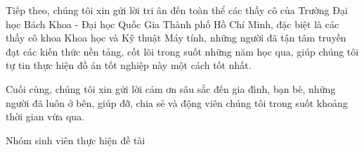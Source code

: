 Tiếp theo, chúng tôi xin gửi lời tri ân đến toàn thể các thầy cô của Trường Đại học Bách Khoa - Đại học Quốc Gia Thành phố Hồ Chí Minh, đặc biệt là các thầy cô khoa Khoa học và Kỹ thuật Máy tính, những người đã tận tâm truyền đạt các kiến thức nền tảng, cốt lõi trong suốt những năm học qua, giúp chúng tôi tự tin thực hiện đồ án tốt nghiệp này một cách tốt nhất.\vspace{0.5cm}

Cuối cùng, chúng tôi xin gửi lời cảm ơn sâu sắc đến gia đình, bạn bè, những người đã luôn ở bên, giúp đỡ, chia sẻ và động viên chúng tôi trong suốt khoảng thời gian vừa qua.\vspace{0.5cm}

\begin{flushright}
Nhóm sinh viên thực hiện đề tài
\end{flushright}
